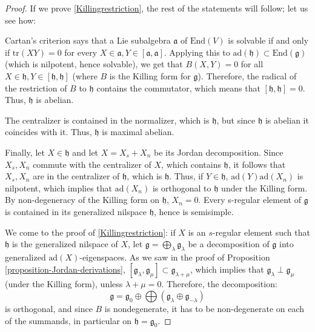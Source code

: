 \begin{proof}
If we prove \eqref{Killingrestriction}, the rest of the statements will follow; let us see how: 

Cartan's criterion says that a Lie subalgebra $\mathfrak a$ of $\text{End}(V)$ is solvable if and only if $\text{tr}(XY)=0$ for every $X\in \mathfrak a, Y\in [\mathfrak a,\mathfrak a]$. Applying this to $\text{ad}(\mathfrak h)\subset \text{End}(\mathfrak g)$ (which is nilpotent, hence solvable), we get that $B(X,Y)=0$ for all $X\in \mathfrak h, Y\in[\mathfrak h,\mathfrak h]$ (where $B$ is the Killing form for $\mathfrak g$). Therefore, the radical of the restriction of $B$ to $\mathfrak h$ contains the commutator, which means that $[\mathfrak h,\mathfrak h]=0$. Thus, $\mathfrak h$ is abelian.

The centralizer is contained in the normalizer, which is $\mathfrak h$, but since $\mathfrak h$ is abelian it coincides with it. Thus, $\mathfrak h$ is maximal abelian.

Finally, let $X\in\mathfrak h$ and let $X=X_s+X_n$ be its Jordan decomposition. Since $X_s, X_n$ commute with the centralizer of $X$, which contains $\mathfrak h$, it follows that $X_s, X_n$ are in the centralizer of $\mathfrak h$, which is $\mathfrak h$. Thus, if $Y\in\mathfrak h$, $\text{ad}(Y)\text{ad}(X_n)$ is nilpotent, which implies that $\text{ad}(X_n)$ is orthogonal to $\mathfrak h$ under the Killing form. By non-degeneracy of the Killing form on $\mathfrak h$, $X_n=0$. Every s-regular element of $\mathfrak g$ is contained in its generalized nilspace $\mathfrak h$, hence is semisimple.

We come to the proof of \eqref{Killingrestriction}: if $X$ is an $s$-regular element such that $\mathfrak h$ is the generalized nilspace of $X$, let $\mathfrak g = \bigoplus_\lambda \mathfrak g_\lambda$ be a decomposition of $\mathfrak g$ into generalized $\text{ad}(X)$-eigenspaces. As we saw in the proof of Proposition \ref{proposition-Jordan-derivations}, $[\mathfrak g_\lambda,\mathfrak g_\mu]\subset \mathfrak g_{\lambda+\mu}$, which implies that $\mathfrak g_\lambda \perp \mathfrak g_\mu$ (under the Killing form), unless $\lambda+\mu=0$. Therefore, the decomposition:
$$ \mathfrak g = \mathfrak g_0 \oplus \bigoplus (\mathfrak g_{\lambda}\oplus \mathfrak g_{-\lambda})$$
is orthogonal, and since $B$ is nondegenerate, it has to be non-degenerate on each of the summands, in particular on $\mathfrak h=\mathfrak g_0$.
\end{proof}




